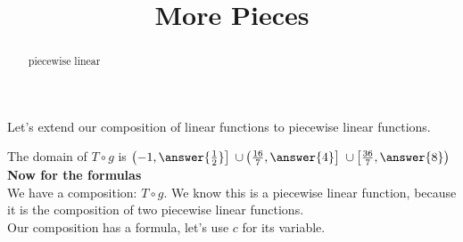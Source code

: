 \documentclass{ximera}
\title{More Pieces}
\begin{document}
\begin{abstract}
piecewise linear
\end{abstract}
\maketitle







Let's extend our composition of linear functions to piecewise linear functions.








The domain of $T \circ g$ is $\left( -1, \answer{\frac{1}{2}} \right]$ $\cup \left( \frac{16}{7}, \answer{4} \right]$ $\cup \left[ \frac{36}{7}, \answer{8} \right)$ \\


\textbf{Now for the formulas} \\


We have a composition: $T \circ g$.  We know this is a piecewise linear function, because it is the composition of two piecewise linear functions. \\

Our composition has a formula, let's use $c$ for its variable. \\
\end{document}
